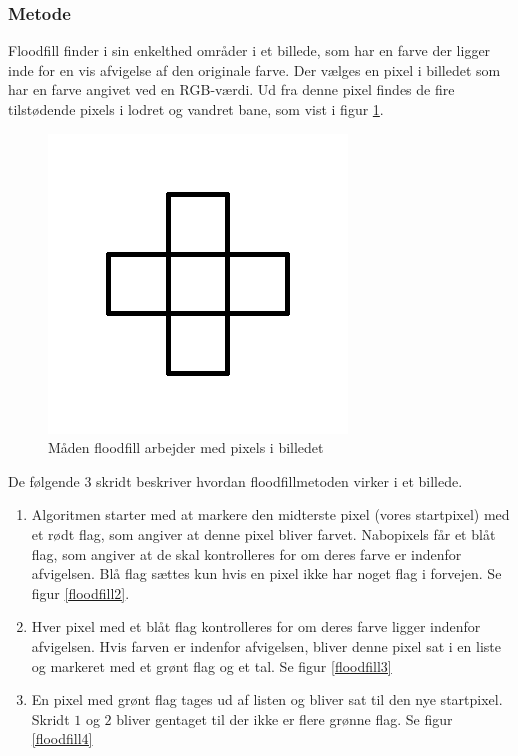 {

\subsubsection{Metode}
Floodfill finder i sin enkelthed områder i et billede, som har en farve
der ligger inde for en vis afvigelse af den originale farve. Der vælges
en pixel i billedet som har en farve angivet ved en RGB-værdi. Ud fra
denne pixel findes de fire tilstødende pixels i lodret og vandret bane,
som vist i figur \ref{floodfill1}.

\begin{figure}[!h]
    \begin{center}
        \includegraphics[scale=0.42,angle=0]{afsnit/vores_implementation/billeder/flood_fill/floodfill1}
    \end{center}
    \caption[]{Måden floodfill arbejder med pixels i billedet}
    \label{floodfill1}
\end{figure}

De følgende 3 skridt beskriver hvordan floodfillmetoden virker i et
billede.
\begin{enumerate}
    \item Algoritmen starter med at markere den midterste pixel (vores
        startpixel) med et rødt flag, som angiver at denne pixel bliver
        farvet. Nabopixels får et blåt flag, som angiver at de skal
        kontrolleres for om deres farve er indenfor afvigelsen. Blå flag
        sættes kun hvis en pixel ikke har noget flag i forvejen. Se
        figur \ref{floodfill2}.
    \item Hver pixel med et blåt flag kontrolleres for om deres
        farve ligger indenfor afvigelsen. Hvis farven er indenfor
        afvigelsen, bliver denne pixel sat i en liste og markeret med et
        grønt flag og et tal. Se figur \ref{floodfill3}
    \item En pixel med grønt flag tages ud af listen og bliver sat til
        den nye startpixel. Skridt $1$ og $2$ bliver gentaget til der
        ikke er flere grønne flag. Se figur \ref{floodfill4}
\end{enumerate}

}
